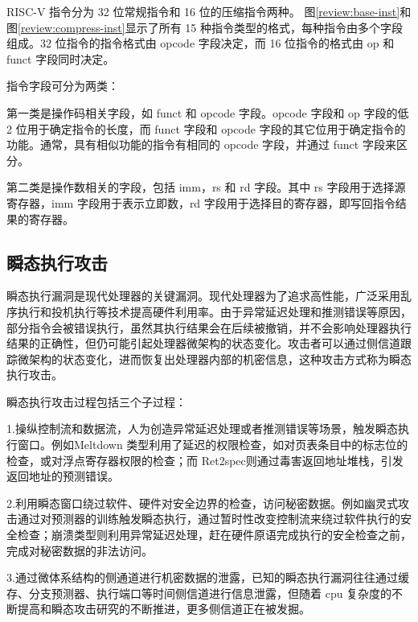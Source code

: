 RISC-V 指令分为 32 位常规指令和 16 位的压缩指令两种。 图\ref{review:base-inst}和图\ref{review:compress-inst}显示了所有 15 种指令类型的格式，每种指令由多个字段组成。32 位指令的指令格式由 opcode 字段决定，而 16 位指令的格式由 op 和 funct 字段同时决定。\par

指令字段可分为两类：\par

第一类是操作码相关字段，如 funct 和 opcode 字段。opcode 字段和 op 字段的低 2 位用于确定指令的长度，而 funct 字段和 opcode 字段的其它位用于确定指令的功能。通常，具有相似功能的指令有相同的 opcode 字段，并通过 funct 字段来区分。\par

第二类是操作数相关的字段，包括 imm，rs 和 rd 字段。其中 rs 字段用于选择源寄存器，imm 字段用于表示立即数，rd 字段用于选择目的寄存器，即写回指令结果的寄存器。\par

\subsection{瞬态执行攻击}
瞬态执行漏洞是现代处理器的关键漏洞。现代处理器为了追求高性能，广泛采用乱序执行和投机执行等技术提高硬件利用率。由于异常延迟处理和推测错误等原因，部分指令会被错误执行，虽然其执行结果会在后续被撤销，并不会影响处理器执行结果的正确性，但仍可能引起处理器微架构的状态变化。攻击者可以通过侧信道跟踪微架构的状态变化，进而恢复出处理器内部的机密信息，这种攻击方式称为瞬态执行攻击。\par

瞬态执行攻击过程包括三个子过程：\par

1.操纵控制流和数据流，人为创造异常延迟处理或者推测错误等场景，触发瞬态执行窗口。例如Meltdown 类型利用了延迟的权限检查，如对页表条目中的标志位的检查\cite{horn2018meltdown}，或对浮点寄存器权限的检查\cite{stecklina1806lazyfp}；而 Ret2spec\cite{maisuradze2018ret2spec}则通过毒害返回地址堆栈，引发返回地址的预测错误。\par

2.利用瞬态窗口绕过软件、硬件对安全边界的检查，访问秘密数据。例如幽灵式攻击通过对预测器的训练触发瞬态执行，通过暂时性改变控制流来绕过软件执行的安全检查；崩溃类型则利用异常延迟处理，赶在硬件原语完成执行的安全检查之前，完成对秘密数据的非法访问。\par

3.通过微体系结构的侧通道进行机密数据的泄露，已知的瞬态执行漏洞往往通过缓存\cite{yarom2014flush+}、分支预测器\cite{evtyushkin2018branchscope}、执行端口\cite{bhattacharyya2019smotherspectre}等时间侧信道进行信息泄露，但随着 cpu 复杂度的不断提高和瞬态攻击研究的不断推进，更多侧信道正在被发掘。\par

